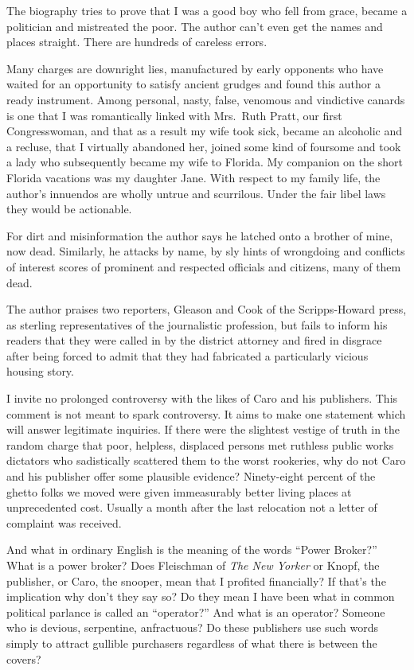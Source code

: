 \documentclass[11pt,letterpaper]{article}
\begin{document}
The biography tries to prove that I was a good boy who fell from grace, became a politician and mistreated the poor. The author can't even get the names and places straight. There are hundreds of careless errors.

Many charges are downright lies, manufactured by early opponents who have waited for an opportunity to satisfy ancient grudges and found this author a ready instrument. Among personal, nasty, false, venomous and vindictive canards is one that I was romantically linked with Mrs.\ Ruth Pratt, our first Congresswoman, and that as a result my wife took sick, became an alcoholic and a recluse, that I virtually abandoned her, joined some kind of foursome and took a lady who subsequently became my wife to Florida. My companion on the short Florida vacations was my daughter Jane. With respect to my family life, the author's innuendos are wholly untrue and scurrilous. Under the fair libel laws they would be actionable.

For dirt and misinformation the author says he latched onto a brother of mine, now dead. Similarly, he attacks by name, by sly hints of wrongdoing and conflicts of interest scores of prominent and respected officials and citizens, many of them dead.

The author praises two reporters, Gleason and Cook of the Scripps-Howard press, as sterling representatives of the journalistic profession, but fails to inform his readers that they were called in by the district attorney and fired in disgrace after being forced to admit that they had fabricated a particularly vicious housing story.

I invite no prolonged controversy with the likes of Caro and his publishers. This comment is not meant to spark controversy. It aims to make one statement which will answer legitimate inquiries. If there were the slightest vestige of truth in the random charge that poor, helpless, displaced persons met ruthless public works dictators who sadistically scattered them to the worst rookeries, why do not Caro and his publisher offer some plausible evidence? Ninety-eight percent of the ghetto folks we moved were given immeasurably better living places at unprecedented cost. Usually a month after the last relocation not a letter of complaint was received.

And what in ordinary English is the meaning of the words \enquote{Power Broker?} What is a power broker? Does Fleischman of \textit{The New Yorker} or Knopf, the publisher, or Caro, the snooper, mean that I profited financially? If that's the implication why don't they say so? Do they mean I have been what in common political parlance is called an \enquote{operator?} And what is an operator? Someone who is devious, serpentine, anfractuous? Do these publishers use such words simply to attract gullible purchasers regardless of what there is between the covers?
\end{document}
